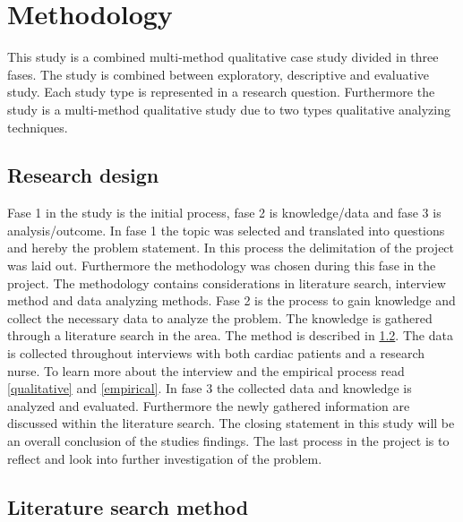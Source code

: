 \chapter{Methodology}

This study is a combined multi-method qualitative case study divided in three fases.
The study is combined between exploratory, descriptive and evaluative study. Each study type is represented in a research question. Furthermore the study is a multi-method qualitative study due to two types qualitative analyzing techniques. 
\section{Research design}


 Fase 1 in the study is the initial process, fase 2 is knowledge/data and fase 3 is analysis/outcome. 
In fase 1 the topic was selected and translated into questions and hereby the problem statement. In this process the delimitation of the project was laid out. Furthermore the methodology was chosen during this fase in the project. The methodology contains considerations in literature search, interview method and data analyzing methods. 
Fase 2 is the process to gain knowledge and collect the necessary data to analyze the problem. The knowledge is gathered through a literature search in the area. The method is described in \cref{literature}. The data is collected throughout interviews with both cardiac patients and a research nurse. To learn more about the interview and the empirical process read \cref{qualitative} and \cref{empirical}.
In fase 3 the collected data and knowledge is analyzed and evaluated. Furthermore the newly gathered information are discussed within the literature search. The closing statement in this study will be an overall conclusion of the studies findings. The last process in the project is to reflect and look into further investigation of the problem. 


\section{Literature search method}
\label{literature}

